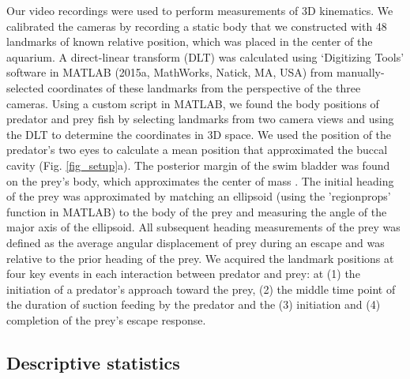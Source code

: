 \documentclass[]{rsos}%
\begin{document}
Our video recordings were used to perform measurements of 3D kinematics. 
We calibrated the cameras by recording a static body that we constructed with 48 landmarks of known relative position, which was placed in the center of the aquarium.
A direct-linear transform (DLT) was calculated using `Digitizing Tools' software in MATLAB (2015a, MathWorks, Natick, MA, USA) \cite{Hedrick:2008wz} from manually-selected coordinates of these landmarks from the perspective of the three cameras.
Using a custom script in MATLAB, we found the body positions of predator and prey fish by selecting landmarks from two camera views and using the DLT to determine the coordinates in 3D space.
We used the position of the predator's two eyes to calculate a mean position that approximated the buccal cavity (Fig. \ref{fig_setup}a).
The posterior margin of the swim bladder was found on the prey's body, which approximates the center of mass \cite{Stewart:2010ig}.
The initial heading of the prey was approximated by matching an ellipsoid (using the 'regionprops' function in MATLAB) to the body of the prey and measuring the angle of the major axis of the ellipsoid.
All subsequent heading measurements of the prey was defined as the average angular displacement of prey during an escape and was relative to the prior heading of the prey.
We acquired the landmark positions at four key events in each interaction between predator and prey: at (1) the initiation of a predator's approach toward the prey, (2) the middle time point of the duration of suction feeding by the predator and the (3) initiation and (4) completion of the prey's escape response.


\subsection{Descriptive statistics}
\end{document}
